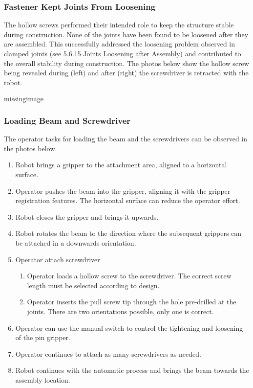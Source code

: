 \subsubsection{Fastener Kept Joints From Loosening}
\label{subsubsection:exploration_4_fastener_kept_joints_from_loosening}

The hollow screws performed their intended role to keep the structure stable during construction. None of the joints have been found to be loosened after they are assembled. This successfully addressed the loosening problem observed in clamped joints (see 5.6.15 Joints Loosening after Assembly) and contributed to the overall stability during construction. The photos below show the hollow screw being revealed during (left) and after (right) the screwdriver is retracted with the robot.

missingimage

\subsubsection{Loading Beam and Screwdriver}
\label{subsubsection:exploration_4_loading_beam_and_screwdriver}

The operator tasks for loading the beam and the screwdrivers can be observed in the photos below. 
\begin{enumerate}
    \item Robot brings a gripper to the attachment area, aligned to a horizontal surface.
    \item Operator pushes the beam into the gripper, aligning it with the gripper registration features. The horizontal surface can reduce the operator effort.
    \item Robot closes the gripper and brings it upwards.
    \item Robot rotates the beam to the direction where the subsequent grippers can be attached in a downwards orientation.
    \item Operator attach screwdriver
    \begin{enumerate}
        \item Operator loads a hollow screw to the screwdriver. The correct screw length must be selected according to design.
        \item Operator inserts the pull screw tip through the hole pre-drilled at the joints. There are two orientations possible, only one is correct.
    \end{enumerate}
    \item Operator can use the manual switch to control the tightening and loosening of the pin gripper.
    \item Operator continues to attach as many screwdrivers as needed.
    \item Robot continues with the automatic process and brings the beam towards the assembly location.
\end{enumerate}

